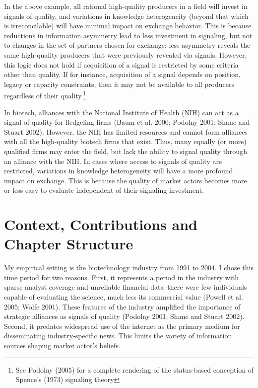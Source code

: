 In the above example, all rational high-quality producers in a field will invest in signals of quality, and variations in knowledge heterogeneity (beyond that which is irreconcilable) will have minimal impact on exchange behavior. This is because reductions in information asymmetry lead to less investment in signaling, but not to changes in the set of partners chosen for exchange; less asymmetry reveals the same high-quality producers that were previously revealed via signals. However, this logic does not hold if acquisition of a signal is restricted by some criteria other than quality. If for instance, acquisition of a signal depends on position, legacy or capacity constraints, then it may not be available to all producers regardless of their quality.\footnote{See Podolny (2005) for a complete rendering of the status-based conception of Spence's (1973) signaling theory} 

In biotech, alliances with the National Institute of Health (NIH) can act as a signal of quality for fledgeling firms (Baum et al. 2000; Podolny 2001; Shane and Stuart 2002). However, the NIH has limited resources and cannot form alliances with all the high-quality biotech firms that exist. Thus, many equally (or more) qualified firms may enter the field, but lack the ability to signal quality through an alliance with the NIH. In cases where access to signals of quality are restricted, variations in knowledge heterogeneity will have a more profound impact on exchange. This is because the quality of market actors becomes more or less easy to evaluate independent of their signaling investment. 

\section{Context, Contributions and Chapter Structure}

My empirical setting is the biotechnology industry from 1991 to 2004. I chose this time period for two reasons. First, it represents a period in the industry with sparse analyst coverage and unreliable financial data--there were few individuals capable of evaluating the science, much less its commercial value (Powell et al. 2005; Wolfe 2001). These features of the industry amplified the importance of strategic alliances as signals of quality (Podolny 2001; Shane and Stuart 2002). Second, it predates widespread use of the internet as the primary medium for disseminating industry-specific news. This limits the variety of information sources shaping market actor's beliefs.

